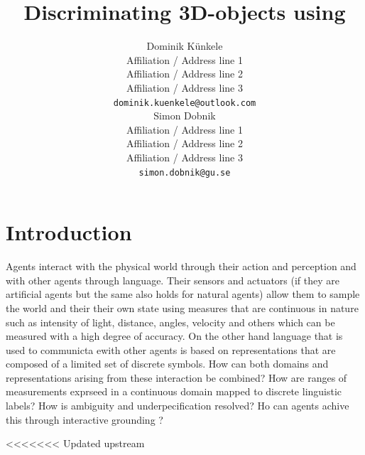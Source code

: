 \documentclass[11pt]{article}
\title{Discriminating 3D-objects using }
\author{Dominik Künkele \\
  Affiliation / Address line 1 \\
  Affiliation / Address line 2 \\
  Affiliation / Address line 3 \\
  \texttt{dominik.kuenkele@outlook.com} \\\And
  Simon Dobnik \\
  Affiliation / Address line 1 \\
  Affiliation / Address line 2 \\
  Affiliation / Address line 3 \\
  \texttt{simon.dobnik@gu.se} \\}
\begin{document}
\maketitle
\begin{abstract}

\end{abstract}

\section{Introduction}

Agents interact with the physical world through their action and perception and with other agents through language.
Their sensors and actuators (if they are artificial agents but the same also holds for natural agents) allow them to sample the world and their their own state using measures that are continuous in nature such as intensity of light, distance, angles, velocity and others which can be measured with a high degree of accuracy.
On the other hand language that is used to communicta ewith other agents is based on representations that are composed of a limited set of discrete symbols.
How can both domains and representations arising from these interaction be combined? How are ranges of measurements exprseed in a continuous domain mapped to discrete linguistic labels?
How is ambiguity and underpecification resolved?
Ho can agents achive this through interactive grounding \citep{Regier:1996,Roy:2005,Cooper:2023aa}?


<<<<<<< Updated upstream
\end{document}
